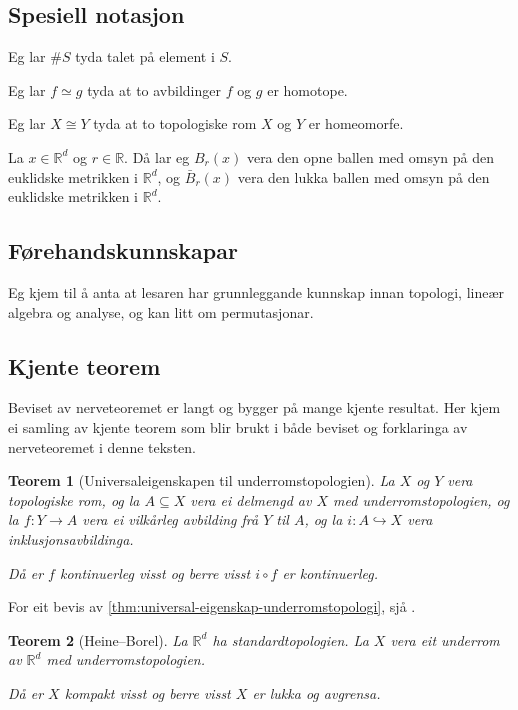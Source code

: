 \documentclass[a4paper, 12pt, norsk]{article}
\theoremstyle{plain}
\newtheorem{theorem}{Teorem}[section]
\theoremstyle{definition}
\newcommand{\Rb}{\mathbb{R}}
\begin{document}
\subsection{Spesiell notasjon}
 
Eg lar \( \#S \) tyda talet på element i \( S \).

Eg lar \( f \simeq  g \) tyda at to avbildinger \( f \) og \( g \) er homotope.

Eg lar \( X \cong Y \) tyda at to topologiske rom \( X \) og \( Y \) er homeomorfe.

La \( x \in \Rb^d \) og \( r \in \Rb \). Då lar eg \( B_r(x) \) vera den opne ballen med omsyn på den euklidske metrikken i \( \Rb^d \), og \( \bar{B}_r(x) \) vera den lukka ballen med omsyn på den euklidske metrikken i \( \Rb^d \).

\subsection{Førehandskunnskapar}

Eg kjem til å anta at lesaren har grunnleggande kunnskap innan topologi, lineær algebra og analyse, og kan litt om permutasjonar.

\subsection{Kjente teorem}

Beviset av nerveteoremet er langt og bygger på mange kjente resultat. Her kjem ei samling av kjente teorem som blir brukt i både beviset og forklaringa av nerveteoremet i denne teksten.

\begin{theorem}[Universaleigenskapen til underromstopologien] \label{thm:universal-eigenskap-underromstopologi}
	La \( X \) og \( Y \) vera topologiske rom, og la \( A \subseteq X \) vera ei delmengd av \( X \) med underromstopologien, og la \( f: Y \to A \) vera ei vilkårleg avbilding frå \( Y \) til \( A \), og la \( i: A \hookrightarrow X \) vera inklusjonsavbildinga. 
	
	Då er \( f \) kontinuerleg visst og berre visst \( i \circ f \) er kontinuerleg.
\end{theorem}

For eit bevis av \autoref{thm:universal-eigenskap-underromstopologi}, sjå \cite[s. 98]{MR2548039}.

\begin{theorem}[Heine--Borel] \label{thm:heine-borel} 
	La \( \Rb^d \) ha standardtopologien. La \( X \) vera eit underrom av \( \Rb^d \) med underromstopologien.
	
	Då er \( X \) kompakt visst og berre visst \( X \) er lukka og avgrensa.
\end{theorem}
\end{document}
